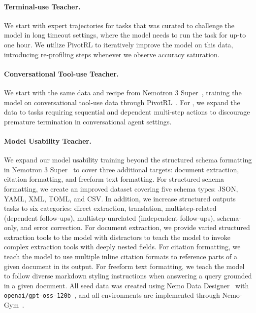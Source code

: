 \paragraph{Terminal-use Teacher.}
We start with expert trajectories for tasks that was curated to challenge the model in long timeout settings, where the model needs to run the task for up-to one hour. We utilize PivotRL \citep{yi2026pivotrl} to iteratively improve the model on this data, introducing re-profiling steps whenever we observe accuracy saturation. 

\paragraph{Conversational Tool-use Teacher.}
We start with the same data and recipe from Nemotron 3 Super~\citep{nvidia2026nemotron3superopen}, training the model on conversational tool-use data through PivotRL~\citep{yi2026pivotrl}. For \ourmodel, we expand the data to tasks requiring sequential and dependent multi-step actions to discourage premature termination in conversational agent settings.

\paragraph{Model Usability Teacher.}
We expand our model usability training beyond the structured schema formatting in Nemotron 3 Super~\citep{nvidia2026nemotron3superopen} to cover three additional targets: document extraction, citation formatting, and freeform text formatting. For structured schema formatting, we create an improved dataset covering five schema types: JSON, YAML, XML, TOML, and CSV. In addition, we increase structured outputs tasks to six categories: direct extraction, translation, multistep-related (dependent follow-ups), multistep-unrelated (independent follow-ups), schema-only, and error correction. For document extraction, we provide varied structured extraction tools to the model with distractors to teach the model to invoke complex extraction tools with deeply nested fields. For citation formatting, we teach the model to use multiple inline citation formats to reference parts of a given document in its output. For freeform text formatting, we teach the model to follow diverse markdown styling instructions when answering a query grounded in a given document. All seed data was created using Nemo Data Designer~\citep{nemo-data-designer} with \texttt{openai/gpt-oss-120b}~\citep{openai2025gptoss120bgptoss20bmodel}, and all environments are implemented through Nemo-Gym~\citep{nemo-gym}.


